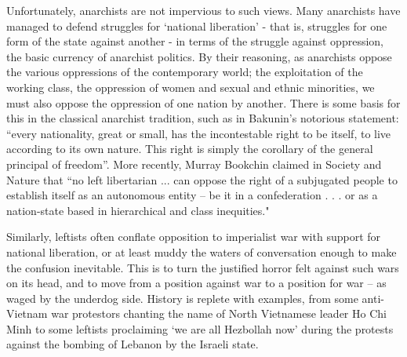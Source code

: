 Unfortunately, anarchists are not impervious to such views.
Many anarchists have managed to defend struggles for ‘national liberation’ - that is, struggles for one form of the state against another - in terms of the struggle against oppression, the basic currency of anarchist politics.
By their reasoning, as anarchists oppose the various oppressions of the contemporary world; the exploitation of the working class, the oppression of women and sexual and ethnic minorities, we must also oppose the oppression of one nation by another.
There is some basis for this in the classical anarchist tradition, such as in Bakunin’s notorious statement: “every nationality, great or small, has the incontestable right to be itself, to live according to its own nature.
This right is simply the corollary of the general principal of freedom”.
More recently, Murray Bookchin claimed in Society and Nature that “no left libertarian ...
can oppose the right of a subjugated people to establish itself as an autonomous entity -- be it in a confederation .
.
.
or as a nation-state based in hierarchical and class inequities."

Similarly, leftists often conflate opposition to imperialist war with support for national liberation, or at least muddy the waters of conversation enough to make the confusion inevitable.
This is to turn the justified horror felt against such wars on its head, and to move from a position against war to a position for war – as waged by the underdog side.
History is replete with examples, from some anti-Vietnam war protestors chanting the name of North Vietnamese leader Ho Chi Minh to some leftists proclaiming ‘we are all Hezbollah now’ during the protests against the bombing of Lebanon by the Israeli state.

